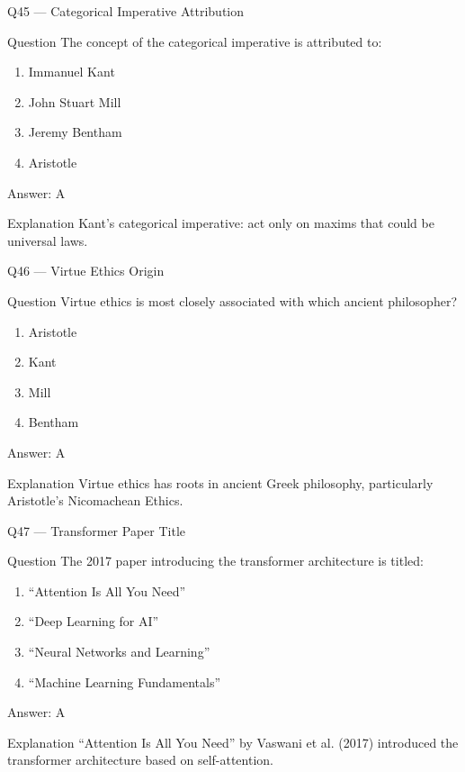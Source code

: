 \documentclass[aspectratio=169,8pt]{beamer}
\begin{document}
	\begin{frame}{Q45 --- Categorical Imperative Attribution}
		\begin{block}{Question}
			The concept of the categorical imperative is attributed to:
			\begin{enumerate}
				\item Immanuel Kant
				\item John Stuart Mill
				\item Jeremy Bentham
				\item Aristotle
			\end{enumerate}
		\end{block}
		\begin{exampleblock}{Answer: A}\end{exampleblock}
		\begin{block}{Explanation}
			Kant's categorical imperative: act only on maxims that could be universal laws.
		\end{block}
	\end{frame}
	
	\begin{frame}{Q46 --- Virtue Ethics Origin}
		\begin{block}{Question}
			Virtue ethics is most closely associated with which ancient philosopher?
			\begin{enumerate}
				\item Aristotle
				\item Kant
				\item Mill
				\item Bentham
			\end{enumerate}
		\end{block}
		\begin{exampleblock}{Answer: A}\end{exampleblock}
		\begin{block}{Explanation}
			Virtue ethics has roots in ancient Greek philosophy, particularly Aristotle's Nicomachean Ethics.
		\end{block}
	\end{frame}
	
	\begin{frame}{Q47 --- Transformer Paper Title}
		\begin{block}{Question}
			The 2017 paper introducing the transformer architecture is titled:
			\begin{enumerate}
				\item ``Attention Is All You Need''
				\item ``Deep Learning for AI''
				\item ``Neural Networks and Learning''
				\item ``Machine Learning Fundamentals''
			\end{enumerate}
		\end{block}
		\begin{exampleblock}{Answer: A}\end{exampleblock}
		\begin{block}{Explanation}
			``Attention Is All You Need'' by Vaswani et al. (2017) introduced the transformer architecture based on self-attention.
		\end{block}
	\end{frame}
	
\end{document}
